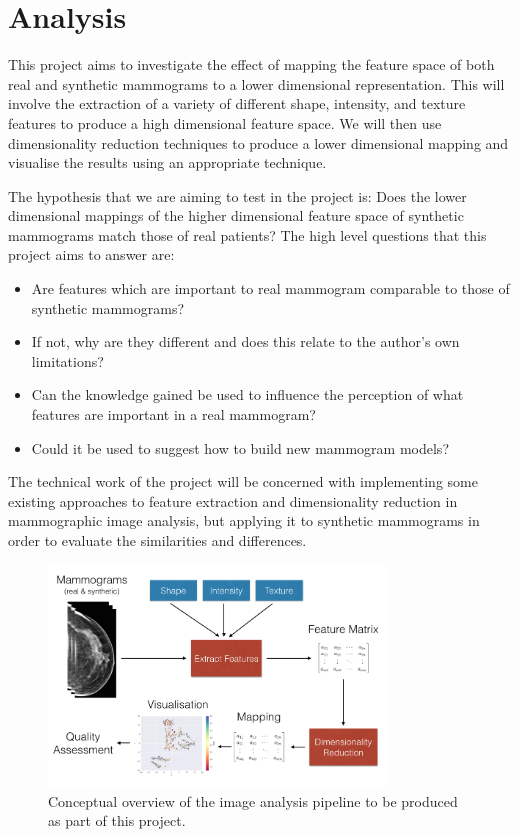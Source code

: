 \section{Analysis}
This project aims to investigate the effect of mapping the feature space of both real and synthetic mammograms to a lower dimensional representation. This will involve the extraction of a variety of different shape, intensity, and texture features to produce a high dimensional feature space. We will then use dimensionality reduction techniques to produce a lower dimensional mapping and visualise the results using an appropriate technique. 

The hypothesis that we are aiming to test in the project is: Does the lower dimensional mappings of the higher dimensional feature space of synthetic mammograms match those of real patients? The high level questions that this project aims to answer are:

\begin{itemize}
	\item Are features which are important to real mammogram comparable to those of synthetic mammograms?
	\item If not, why are they different and does this relate to the author's own limitations?
	\item Can the knowledge gained be used to influence the perception of what features are important in a real mammogram?
	\item Could it be used to suggest how to build new mammogram models?
\end{itemize}

The technical work of the project will be concerned with implementing some existing approaches to feature extraction and dimensionality reduction in mammographic image analysis, but applying it to synthetic mammograms in order to evaluate the similarities and differences.

\begin{figure}
	\label{fig:pipeline-diagram}
	\centering
	\includegraphics[width=0.8\textwidth]{Images/pipeline-diagram.png}	
	\caption{Conceptual overview of the image analysis pipeline to be produced as part of this project.}
\end{figure}


